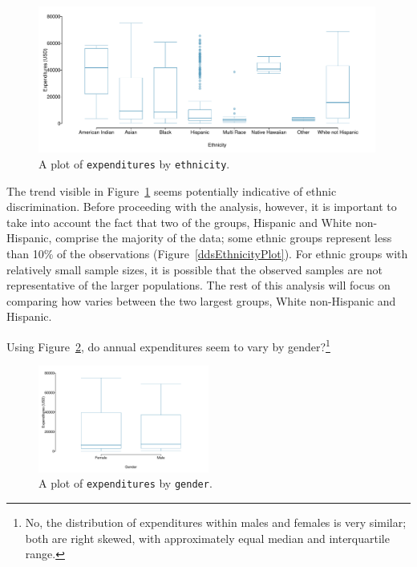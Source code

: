 \begin{figure}[h]
	\centering
	\includegraphics[width=0.99\textwidth]{ch_intro_to_data_oi_biostat/figures/ddsExpEthnicity/ddsExpEthnicity}
	\caption{A plot of \texttt{expenditures} by \texttt{ethnicity}. }
	\label{ddsExpEthnicity}
\end{figure} 

The trend visible in Figure~\ref{ddsExpEthnicity} seems potentially indicative of ethnic discrimination. Before proceeding with the analysis, however, it is important to take into account the fact that two of the groups, Hispanic and White non-Hispanic, comprise the majority of the data; some ethnic groups represent less than 10\% of the observations (Figure~\ref{ddsEthnicityPlot}). For ethnic groups with relatively small sample sizes, it is possible that the observed samples are not representative of the larger populations. The rest of this analysis will focus on comparing how  varies between the two largest groups, White non-Hispanic and Hispanic. 

\begin{exercise} Using Figure~\ref{ddsExpGender}, do annual expenditures seem to vary by gender?\footnote{No, the distribution of expenditures within males and females is very similar; both are right skewed, with approximately equal median and interquartile range. }
	
\begin{figure}[h]
	\centering
	\includegraphics[width=0.5\textwidth]{ch_intro_to_data_oi_biostat/figures/ddsExpGender/ddsExpGender}
	\caption{A plot of \texttt{expenditures} by \texttt{gender}. }
	\label{ddsExpGender}
\end{figure}

\end{exercise}

